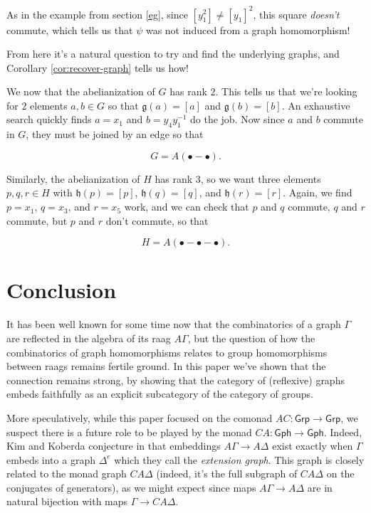 \documentclass[12pt]{article}
\theoremstyle{definition}
\theoremstyle{theorem}
\newcommand*{\catFont}[1]{\mathsf{#1}}
\newcommand{\Grp}{\catFont{Grp}}
\begin{document}
As in the example from section \ref{eg}, since $[y_1^2] \neq [y_1]^2$, 
this square \emph{doesn't} commute, which tells us that $\psi$ was not 
induced from a graph homomorphism!

\bigskip

From here it's a natural question to try and find the underlying graphs, 
and Corollary \ref{cor:recover-graph} tells us how!

We now that the abelianization of $G$ has rank $2$. 
This tells us that we're looking for $2$ elements $a,b \in G$ so 
that $\mathfrak{g}(a) = [a]$ and $\mathfrak{g}(b) = [b]$. An exhaustive 
search quickly finds $a = x_1$ and $b = y_4 y_1^{-1}$ do the job. Now 
since $a$ and $b$ commute in $G$, they must be joined by an edge so that 

\[ G = A(\bullet - \bullet) .\]

Similarly, the abelianization of $H$ has rank $3$, so we want three elements 
$p,q,r \in H$ with $\mathfrak{h}(p) = [p]$, $\mathfrak{h}(q) = [q]$, and 
$\mathfrak{h}(r) = [r]$. Again, we find $p = x_1$, $q = x_3$, and $r = x_5$ 
work, and we can check that $p$ and $q$ commute, $q$ and $r$ commute, but 
$p$ and $r$ don't commute, so that 

\[ H = A(\bullet - \bullet - \bullet) .\]

\section{Conclusion}
\label{conclusion}

It has been well known for some time now that the combinatorics of a graph
$\Gamma$ are reflected in the algebra of its raag $A\Gamma$, but the 
question of how the combinatorics of graph homomorphisms relates to 
group homomorphisms between raags remains fertile ground. In this paper we've 
shown that the connection remains strong, by showing that the category of
(reflexive) graphs embeds faithfully as an explicit subcategory of 
the category of groups. 

More speculatively, while this paper focused on the comonad $AC : \Grp \to \Grp$,
we suspect there is a future role to be played by the monad 
$CA : \mathsf{Gph} \to \mathsf{Gph}$. Indeed, Kim and Koberda conjecture 
in \cite{kimEmbedabilityRightangledArtin2013} that embeddings 
$A\Gamma \to A \Delta$ exist exactly when $\Gamma$ embeds into a 
graph $\Delta^e$ which they call the \emph{extension graph}.
This graph is closely related to the monad graph $CA\Delta$ 
(indeed, it's the full subgraph of $CA\Delta$ on the conjugates of generators), 
as we might expect since maps $A\Gamma \to A \Delta$ are in natural 
bijection with maps $\Gamma \to CA \Delta$. 
\end{document}
